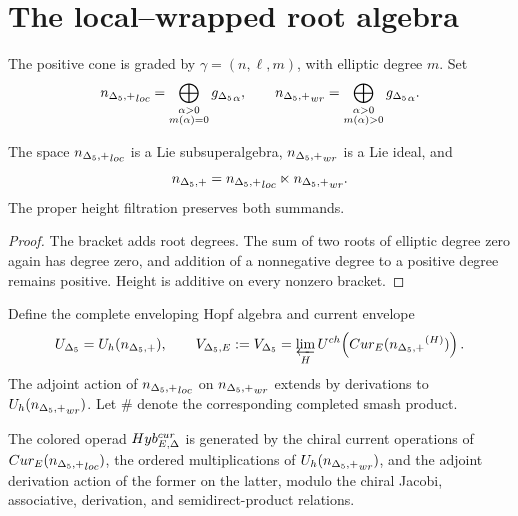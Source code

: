 \chapter{The local--wrapped root algebra}
The positive cone is graded by $\gamma=(n,\ell,m)$, with elliptic degree $m$.  Set
\[
 {n_{\Delta_5,+}}_{loc}=\bigoplus_{\substack{\alpha>0\\m(\alpha)=0}}{g_{\Delta_5}}_\alpha,
 \qquad
 {n_{\Delta_5,+}}_{wr}=\bigoplus_{\substack{\alpha>0\\m(\alpha)>0}}{g_{\Delta_5}}_\alpha.
\]

\begin{proposition}
The space ${n_{\Delta_5,+}}_{loc}$ is a Lie subsuperalgebra, ${n_{\Delta_5,+}}_{wr}$ is a Lie ideal, and
\[
 {n_{\Delta_5,+}}={n_{\Delta_5,+}}_{loc}\ltimes{n_{\Delta_5,+}}_{wr}.
\]
The proper height filtration preserves both summands.
\end{proposition}
\begin{proof}
The bracket adds root degrees.  The sum of two roots of elliptic degree zero again has degree zero, and addition of a nonnegative degree to a positive degree remains positive.  Height is additive on every nonzero bracket.
\end{proof}

Define the complete enveloping Hopf algebra and current envelope
\[
 U_{\Delta_5}=U_h({n_{\Delta_5,+}}),
 \qquad
 V_{\Delta_5,E}:=V_{\Delta_5}=\varprojlim_HU^{ch}\!\left(Cur_E({n_{\Delta_5,+}}^{(H)})\right).
\]
The adjoint action of ${n_{\Delta_5,+}}_{loc}$ on ${n_{\Delta_5,+}}_{wr}$ extends by derivations to $U_h({n_{\Delta_5,+}}_{wr})$.  Let $\# $ denote the corresponding completed smash product.

\begin{definition}
The colored operad $Hyb^{cur}_{E,\Delta}$ is generated by the chiral current operations of $Cur_E({n_{\Delta_5,+}}_{loc})$, the ordered multiplications of $U_h({n_{\Delta_5,+}}_{wr})$, and the adjoint derivation action of the former on the latter, modulo the chiral Jacobi, associative, derivation, and semidirect-product relations.
\end{definition}

